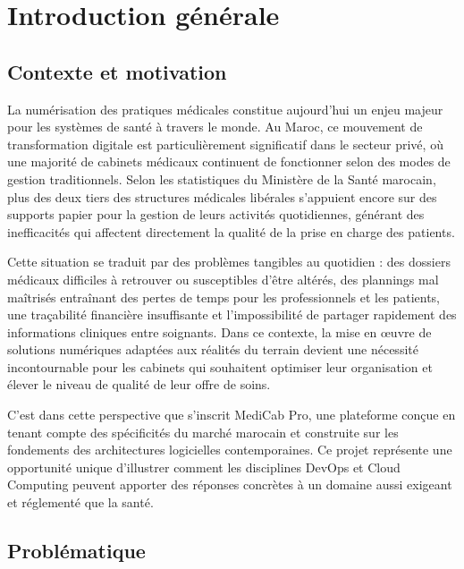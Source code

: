 \chapter{Introduction générale}

\section{Contexte et motivation}

La numérisation des pratiques médicales constitue aujourd'hui un enjeu majeur
pour les systèmes de santé à travers le monde. Au Maroc, ce mouvement de
transformation digitale est particulièrement significatif dans le secteur privé,
où une majorité de cabinets médicaux continuent de fonctionner selon des modes
de gestion traditionnels. Selon les statistiques du Ministère de la Santé marocain,
plus des deux tiers des structures médicales libérales s'appuient encore sur des
supports papier pour la gestion de leurs activités quotidiennes, générant des
inefficacités qui affectent directement la qualité de la prise en charge des patients.

Cette situation se traduit par des problèmes tangibles au quotidien : des dossiers
médicaux difficiles à retrouver ou susceptibles d'être altérés, des plannings mal
maîtrisés entraînant des pertes de temps pour les professionnels et les patients,
une traçabilité financière insuffisante et l'impossibilité de partager rapidement
des informations cliniques entre soignants. Dans ce contexte, la mise en œuvre
de solutions numériques adaptées aux réalités du terrain devient une nécessité
incontournable pour les cabinets qui souhaitent optimiser leur organisation et
élever le niveau de qualité de leur offre de soins.

C'est dans cette perspective que s'inscrit MediCab Pro, une plateforme conçue
en tenant compte des spécificités du marché marocain et construite sur les
fondements des architectures logicielles contemporaines. Ce projet représente
une opportunité unique d'illustrer comment les disciplines DevOps et Cloud
Computing peuvent apporter des réponses concrètes à un domaine aussi exigeant
et réglementé que la santé.

\section{Problématique}

